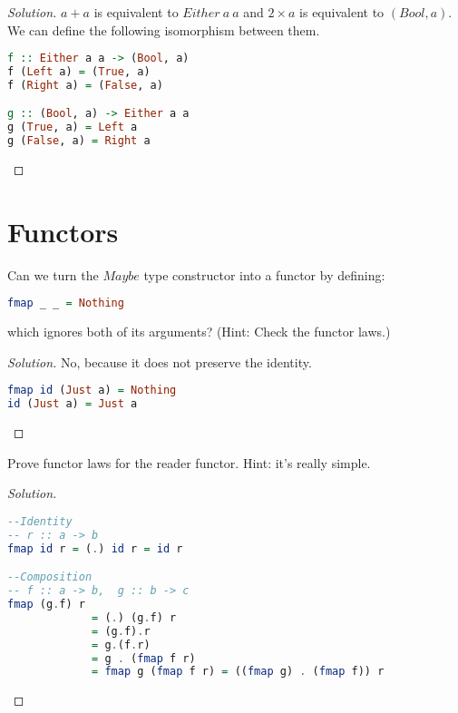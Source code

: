 \documentclass[7x10,thmnumcontwithchapter,WebLink,AddlevelTwoTOC,NumRef,BookEndNote,printer]{pupbook}
\begin{document}
\begin{proof}[Solution]
$a + a$ is equivalent to $Either \ a \ a$ and $2 \times a$ is equivalent to $(Bool, a)$. We can define the following isomorphism between them.
\begin{lstlisting}[language=Haskell]
f :: Either a a -> (Bool, a)
f (Left a) = (True, a)
f (Right a) = (False, a)

g :: (Bool, a) -> Either a a
g (True, a) = Left a
g (False, a) = Right a

\end{lstlisting}
\end{proof}


\chapter[Functors]{Functors\thefootnote}

\begin{exercise}
Can we turn the $Maybe$ type constructor into a functor by defining:
\begin{lstlisting}[language=Haskell]
fmap _ _ = Nothing
\end{lstlisting}
which ignores both of its arguments? (Hint: Check the functor
laws.)
\end{exercise}

\begin{proof}[Solution]
No, because it does not preserve the identity.
\begin{lstlisting}[language=Haskell]
fmap id (Just a) = Nothing
id (Just a) = Just a
\end{lstlisting}
\end{proof}

\begin{exercise}
Prove functor laws for the reader functor. Hint: it’s really simple.
\end{exercise}


\begin{proof}[Solution]
~\\
\begin{lstlisting}[language=Haskell]
--Identity
-- r :: a -> b
fmap id r = (.) id r = id r

--Composition
-- f :: a -> b,  g :: b -> c 
fmap (g.f) r 
             = (.) (g.f) r 
             = (g.f).r 
             = g.(f.r) 
             = g . (fmap f r) 
             = fmap g (fmap f r) = ((fmap g) . (fmap f)) r
\end{lstlisting}
\end{proof}
\end{document}
